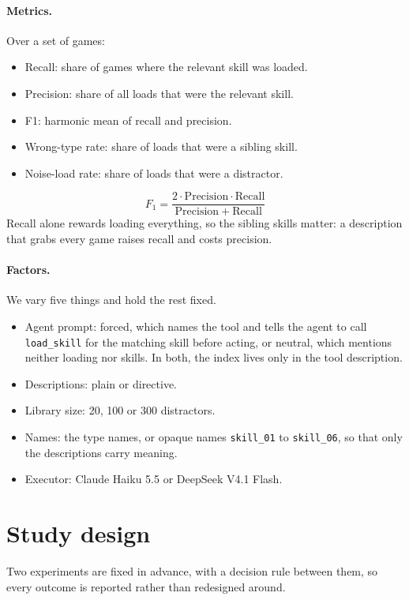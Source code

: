 \documentclass[11pt]{article}
\newcommand{\code}[1]{\texttt{#1}}
\begin{document}
\paragraph{Metrics.} Over a set of games:
\begin{itemize}
\item Recall: share of games where the relevant skill was loaded.
\item Precision: share of all loads that were the relevant skill.
\item F1: harmonic mean of recall and precision.
\item Wrong-type rate: share of loads that were a sibling skill.
\item Noise-load rate: share of loads that were a distractor.
\end{itemize}
\begin{equation}
F_1 = \frac{2 \cdot \mathrm{Precision} \cdot \mathrm{Recall}}{\mathrm{Precision} + \mathrm{Recall}}
\end{equation}
Recall alone rewards loading everything, so the sibling skills matter: a description that grabs every game raises recall and costs precision.

\paragraph{Factors.} We vary five things and hold the rest fixed.
\begin{itemize}
\item Agent prompt: forced, which names the tool and tells the agent to call \code{load\_skill} for the matching skill before acting, or neutral, which mentions neither loading nor skills. In both, the index lives only in the tool description.
\item Descriptions: plain or directive.
\item Library size: 20, 100 or 300 distractors.
\item Names: the type names, or opaque names \code{skill\_01} to \code{skill\_06}, so that only the descriptions carry meaning.
\item Executor: Claude Haiku 5.5 or DeepSeek V4.1 Flash.
\end{itemize}

\section{Study design}
\label{sec:design}

Two experiments are fixed in advance, with a decision rule between them, so every outcome is reported rather than redesigned around.
\end{document}
